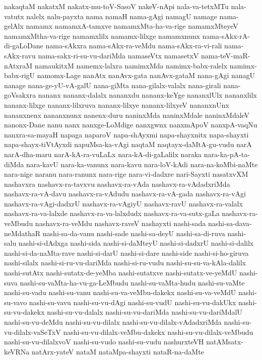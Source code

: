 {nakaqtaM
nakatxM
nakatx-mu-toV-SasoV
nakeV-nApi
nala-va-tetxMTu
nala-vatutx
nalelx
nalu-payxta
nama
namaH
nama-gAgi
namagU
namage
nama-gelAlx
namamx
namamxA-tamxve
namamxMta-ha-va-rige
namamxMteyeV
namamxMtha-va-rige
namamxlilx
namamx-lilxge
namamxnunx
nama-sAkx-rA-di-gaLoDane
nama-sAkxra
nama-sAkx-ra-veMdu
nama-sAkx-ra-vi-rali
nama-sAkx-ravu
nama-sakx-ri-su-vu-dariMda
namaseVtx
namasetxV
nama-teV-maR-nAtxraM
namaukitxM
namemx-lalxra
namimxMda
namimx-babx-ralelx
namimx-babx-rigU
namomx-Lage
nanAtx
nanAvx-gata
nanAvx-gataM
nana-gAgi
nanagU
nanage
nana-ge-yU-vA-galU
nana-giMta
nana-gilalx-valalx
nana-girali
nana-goVsakxra
nananx
nananx-dalalx
nananxdu
nananx-keYge
nananxlUlx
nananxlilx
nananx-lilxge
nananx-lilxruva
nananx-lilxye
nananx-lilxyeV
nananxnUnx
nananxnenx
nananxnunx
nanenx-duru
naninxMda
naninxMdale
naninxMdaleV
nanonx-Dane
nanu
nanx
nanxge-LoMdige
nanxgwnx
nanxmApoV
nanxpA-vaqNu
nanxra-sa-mayaH
napaga
naparoV
napa-shAyxmi
napa-shayxnitx
napa-shayxti
napa-shayx-tiVtAyxdi
napuMsa-ka-vAgi
naqtaM
naqtayx-daMtA-gu-vudu
narA
narA-dha-maru
narA-kA-ra-vuLaLx
nara-kA-di-gaLalilx
naraka
nara-ka-pA-ta-diMda
nara-kavU
nara-ka-vanunx
nara-kavu
nara-loV-kAdi
nara-na-koMbi-naMte
nara-nige
naranu
nara-ranunx
nara-rige
nara-vi-dadxre
nari-Sayxti
nasatxvXM
nashavxra
nashavx-ra-tavxvu
nashavx-ra-vAda
nashavx-ra-vAdadxriMda
nashavx-ra-vA-davu
nashavx-ra-vAdudu
nashavx-ra-vA-gada
nashavx-ra-vAgi
nashavx-ra-vAgi-dadxrU
nashavx-ra-vAgiyU
nashavx-ravU
nashavx-ra-valalx
nashavx-ra-va-lalxde
nashavx-ra-va-lalxdudx
nashavx-ra-va-sutx-gaLa
nashavx-ra-veMbudu
nashavx-ra-veMdu
nashavx-raveV
nashayxti
nashi-sada
nashi-sa-dava-neMdathaR
nashi-sa-da-vanu
nashi-sade
nashi-sa-deyU
nashi-sa-di-ruva
nashi-salu
nashi-si-dAdxga
nashi-sida
nashi-si-daMteyU
nashi-si-dadxrU
nashi-si-dalilx
nashi-si-da-naMta-rave
nashi-si-darU
nashi-si-dare
nashi-side
nashi-si-ho-giruva
nashi-silalx
nashi-si-ru-vu-dariMda
nashi-si-ru-vudu
nashi-su-su-va-kAla-dalilx
nashi-sutAtx
nashi-sutatx-de-yeMba
nashi-sutatxve
nashi-sutatx-ve-yeMdU
nashi-suva
nashi-su-vaMta-ha-vu-ga-LeMbudu
nashi-su-vaMta-hudu
nashi-su-vaMte
nashi-su-vadu
nashi-su-vanu
nashi-su-va-veMbu-dakekx
nashi-su-va-veMdU
nashi-su-vavo
nashi-su-vavu
nashi-su-vu-dAgi
nashi-su-vudU
nashi-su-vu-dakUkx
nashi-su-vu-dakekx
nashi-su-vu-dalalx
nashi-su-vu-dariMda
nashi-su-vu-dariMdalU
nashi-su-vu-deMdu
nashi-su-vu-dilalx
nashi-su-vu-dilalx-vAdadxriMda
nashi-su-vu-dilalx-vaSeTxV
nashi-su-vu-dilalx-veMbu-dakekx
nashi-su-vu-dilalx-veMbudu
nashi-su-vu-dilalxvoV
nashi-su-vudo
nashi-su-vudu
nashurxteVH
natAMsatx-keVRNa
natArx-yateV
nataM
nataMpa-shayxti
nataR-na-daMte
}
